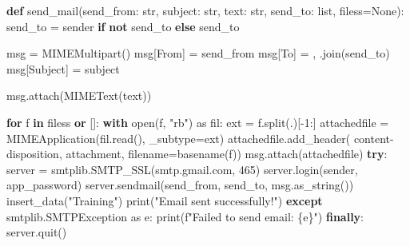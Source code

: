 \documentclass[
  letterpaper,
  DIV=11,
  numbers=noendperiod]{scrreprt}
\newenvironment{Shaded}{\begin{snugshade}}{\end{snugshade}}
\newcommand{\BuiltInTok}[1]{\textcolor[rgb]{0.00,0.23,0.31}{#1}}
\newcommand{\ControlFlowTok}[1]{\textcolor[rgb]{0.00,0.23,0.31}{\textbf{#1}}}
\newcommand{\DecValTok}[1]{\textcolor[rgb]{0.68,0.00,0.00}{#1}}
\newcommand{\ImportTok}[1]{\textcolor[rgb]{0.00,0.46,0.62}{#1}}
\newcommand{\KeywordTok}[1]{\textcolor[rgb]{0.00,0.23,0.31}{\textbf{#1}}}
\newcommand{\NormalTok}[1]{\textcolor[rgb]{0.00,0.23,0.31}{#1}}
\newcommand{\OperatorTok}[1]{\textcolor[rgb]{0.37,0.37,0.37}{#1}}
\newcommand{\SpecialCharTok}[1]{\textcolor[rgb]{0.37,0.37,0.37}{#1}}
\newcommand{\SpecialStringTok}[1]{\textcolor[rgb]{0.13,0.47,0.30}{#1}}
\newcommand{\StringTok}[1]{\textcolor[rgb]{0.13,0.47,0.30}{#1}}
\newcommand{\VariableTok}[1]{\textcolor[rgb]{0.07,0.07,0.07}{#1}}
\begin{document}
\begin{Shaded}
\begin{Highlighting}[]
\KeywordTok{def}\NormalTok{ send\_mail(send\_from: }\BuiltInTok{str}\NormalTok{, subject: }\BuiltInTok{str}\NormalTok{, text: }\BuiltInTok{str}\NormalTok{,}
\NormalTok{              send\_to: }\BuiltInTok{list}\NormalTok{, filess}\OperatorTok{=}\VariableTok{None}\NormalTok{):}
\NormalTok{    send\_to }\OperatorTok{=}\NormalTok{ sender }\ControlFlowTok{if} \KeywordTok{not}\NormalTok{ send\_to }\ControlFlowTok{else}\NormalTok{ send\_to}

\NormalTok{    msg }\OperatorTok{=}\NormalTok{ MIMEMultipart()}
\NormalTok{    msg[}\StringTok{\textquotesingle{}From\textquotesingle{}}\NormalTok{] }\OperatorTok{=}\NormalTok{ send\_from}
\NormalTok{    msg[}\StringTok{\textquotesingle{}To\textquotesingle{}}\NormalTok{] }\OperatorTok{=} \StringTok{\textquotesingle{}, \textquotesingle{}}\NormalTok{.join(send\_to)}
\NormalTok{    msg[}\StringTok{\textquotesingle{}Subject\textquotesingle{}}\NormalTok{] }\OperatorTok{=}\NormalTok{ subject}

\NormalTok{    msg.attach(MIMEText(text))}

    \ControlFlowTok{for}\NormalTok{ f }\KeywordTok{in}\NormalTok{ filess }\KeywordTok{or}\NormalTok{ []:}
        \ControlFlowTok{with} \BuiltInTok{open}\NormalTok{(f, }\StringTok{"rb"}\NormalTok{) }\ImportTok{as}\NormalTok{ fil:}
\NormalTok{            ext }\OperatorTok{=}\NormalTok{ f.split(}\StringTok{\textquotesingle{}.\textquotesingle{}}\NormalTok{)[}\OperatorTok{{-}}\DecValTok{1}\NormalTok{:]}
\NormalTok{            attachedfile }\OperatorTok{=}\NormalTok{ MIMEApplication(fil.read(), \_subtype}\OperatorTok{=}\NormalTok{ext)}
\NormalTok{            attachedfile.add\_header(}
                \StringTok{\textquotesingle{}content{-}disposition\textquotesingle{}}\NormalTok{, }\StringTok{\textquotesingle{}attachment\textquotesingle{}}\NormalTok{, filename}\OperatorTok{=}\NormalTok{basename(f))}
\NormalTok{        msg.attach(attachedfile)}
    \ControlFlowTok{try}\NormalTok{:}
\NormalTok{      server }\OperatorTok{=}\NormalTok{ smtplib.SMTP\_SSL(}\StringTok{\textquotesingle{}smtp.gmail.com\textquotesingle{}}\NormalTok{, }\DecValTok{465}\NormalTok{)}
\NormalTok{      server.login(sender, app\_password)}
\NormalTok{      server.sendmail(send\_from, send\_to, msg.as\_string())}
\NormalTok{      insert\_data(}\StringTok{"Training"}\NormalTok{)}
      \BuiltInTok{print}\NormalTok{(}\StringTok{"Email sent successfully!"}\NormalTok{)}
    \ControlFlowTok{except}\NormalTok{ smtplib.SMTPException }\ImportTok{as}\NormalTok{ e:}
      \BuiltInTok{print}\NormalTok{(}\SpecialStringTok{f"Failed to send email: }\SpecialCharTok{\{}\NormalTok{e}\SpecialCharTok{\}}\SpecialStringTok{"}\NormalTok{)}
    \ControlFlowTok{finally}\NormalTok{:}
\NormalTok{      server.quit()}
\end{Highlighting}
\end{Shaded}
\end{document}
